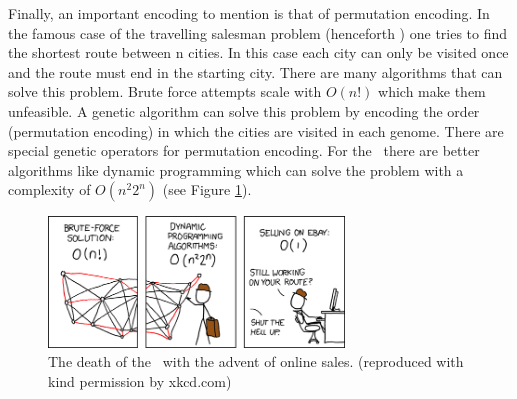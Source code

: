 Finally, an important encoding to mention is that of permutation encoding. In the famous case of the travelling salesman problem (henceforth \tsp) one tries to find the shortest route between n cities. In this case each city can only be visited once and the route must end in the starting city. There are many algorithms that can solve this problem. Brute force attempts scale with $O(n!)$ which make them unfeasible. A genetic algorithm can solve this problem by encoding the order (permutation encoding) in which the cities are visited in each genome. There are special genetic operators for permutation encoding. For the \tsp\ there are better algorithms like dynamic programming which can solve the problem with a complexity of $O(n^2 2^n)$ (see Figure \ref{fig:xkcd_tsp}).

\begin{figure}[htbp] %
   \centering
   \includegraphics[width=0.7\textwidth]{chapter_dalek/plots/travelling_salesman_problem.png} 
   \caption{The death of the \tsp\ with the advent of online sales. (reproduced with kind permission by xkcd.com)}
   \label{fig:xkcd_tsp}
\end{figure}



